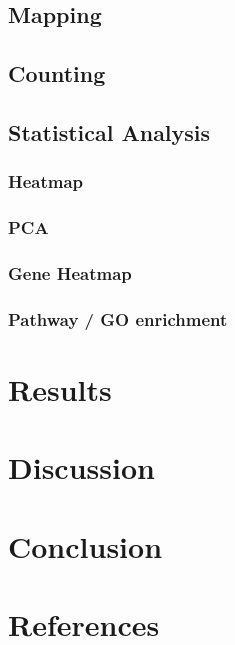 \documentclass[
]{article}
\begin{document}
\subsection{Mapping}\label{mapping-1}

\subsection{Counting}\label{counting}

\subsection{Statistical Analysis}\label{statistical-analysis}

\subsubsection{Heatmap}\label{heatmap}

\subsubsection{PCA}\label{pca}

\subsubsection{Gene Heatmap}\label{gene-heatmap}

\subsubsection{Pathway / GO enrichment}\label{pathway-go-enrichment}

\section{Results}\label{results-1}

\section{Discussion}\label{discussion}

\section{Conclusion}\label{conclusion}

\section{References}\label{references}
\end{document}
